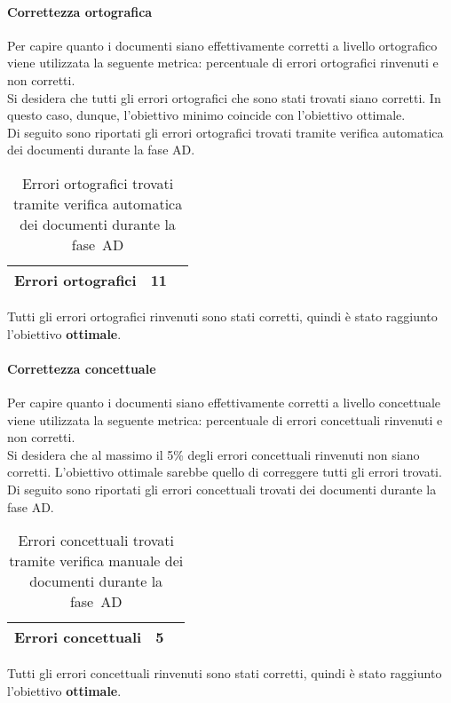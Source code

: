 \documentclass[../PianoDiQualifica.tex]{subfiles}
\begin{document}
\begin{appendices}
			\paragraph{Correttezza ortografica}
			Per capire quanto i documenti siano effettivamente corretti a livello ortografico viene utilizzata la seguente metrica: percentuale di errori ortografici rinvenuti e non corretti.\\
			Si desidera che tutti gli errori ortografici che sono stati trovati siano corretti. In questo caso, dunque, l'obiettivo minimo coincide con l’obiettivo ottimale.\\
			Di seguito sono riportati gli errori ortografici trovati tramite verifica automatica dei documenti durante la fase AD.
			\begin{table}[H]
				\centering
				\begin{tabular}{l * {2}{c}}
					\midrule
					Errori ortografici & 11 \\
					\midrule
				\end{tabular}
				\caption{Errori ortografici trovati tramite verifica automatica dei documenti durante la fase\g\ AD}
				\label{tab:errori_automatica}
			\end{table}
			Tutti gli errori ortografici rinvenuti sono stati corretti, quindi è stato raggiunto l'obiettivo \textbf{ottimale}.
			
			\paragraph{Correttezza concettuale}
			Per capire quanto i documenti siano effettivamente corretti a livello concettuale viene utilizzata la seguente metrica: percentuale di errori concettuali rinvenuti e non corretti.\\
			Si desidera che al massimo il 5\% degli errori concettuali rinvenuti non siano corretti. L’obiettivo ottimale sarebbe quello di correggere tutti gli errori trovati. \\
			Di seguito sono riportati gli errori concettuali trovati dei documenti durante la fase AD.
			\begin{table}[H]
				\centering
				\begin{tabular}{l * {2}{c}}
					\midrule
					Errori concettuali & 5 \\
					\midrule
				\end{tabular}
				\caption{Errori concettuali trovati tramite verifica manuale dei documenti durante la fase\g\ AD}
				\label{tab:errori_concettuali}
			\end{table}
			Tutti gli errori concettuali rinvenuti sono stati corretti, quindi è stato raggiunto l'obiettivo \textbf{ottimale}.
			
\end{appendices}
\end{document}
